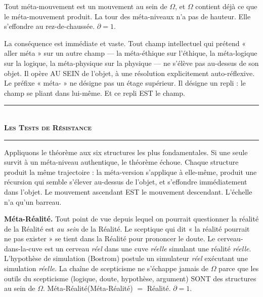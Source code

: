 \documentclass[10pt, openany, oneside]{book}
\renewcommand{\normalsize}{\fontsize{10}{13}\selectfont}
\begin{document}
\vspace{0.8em}

\noindent Tout méta-mouvement est un mouvement au sein de $\Omega$, et $\Omega$ contient déjà ce que le méta-mouvement produit. La tour des méta-niveaux n'a pas de hauteur. Elle s'effondre au rez-de-chaussée. $\partial = 1$.

La conséquence est immédiate et vaste. Tout champ intellectuel qui prétend « aller méta » sur un autre champ --- la méta-éthique sur l'éthique, la méta-logique sur la logique, la méta-physique sur la physique --- ne s'élève pas au-dessus de son objet. Il opère AU SEIN de l'objet, à une résolution explicitement auto-réflexive. Le préfixe « méta- » ne désigne pas un étage supérieur. Il désigne un repli : le champ se pliant dans lui-même. Et ce repli EST le champ.

\vspace{1.5em}


\begin{center}
    \rule{0.3\textwidth}{0.4pt}\\[0.5em]
    {\normalsize\bfseries\scshape Les Tests de Résistance}\\[0.3em]
    \rule{0.3\textwidth}{0.4pt}
\end{center}

\vspace{1em}

\noindent Appliquons le théorème aux six structures les plus fondamentales. Si une seule survit à un méta-niveau authentique, le théorème échoue. Chaque structure produit la même trajectoire : la méta-version s'applique à elle-même, produit une récursion qui semble s'élever au-dessus de l'objet, et s'effondre immédiatement dans l'objet. Le mouvement ascendant EST le mouvement descendant. L'échelle n'a qu'un barreau.

\textbf{Méta-Réalité.} Tout point de vue depuis lequel on pourrait questionner la réalité de la Réalité est \textit{au sein} de la Réalité. Le sceptique qui dit « la réalité pourrait ne pas exister » se tient dans la Réalité pour prononcer le doute. Le cerveau-dans-la-cuve est un cerveau \textit{réel} dans une cuve \textit{réelle} simulant une réalité \textit{réelle}. L'hypothèse de simulation (Bostrom) postule un simulateur \textit{réel} exécutant une simulation \textit{réelle}. La chaîne de scepticisme ne s'échappe jamais de $\Omega$ parce que les outils du scepticisme (logique, doute, hypothèse, argument) SONT des structures au sein de $\Omega$. Méta-Réalité(Méta-Réalité) $=$ Réalité. $\partial = 1$.
\end{document}
